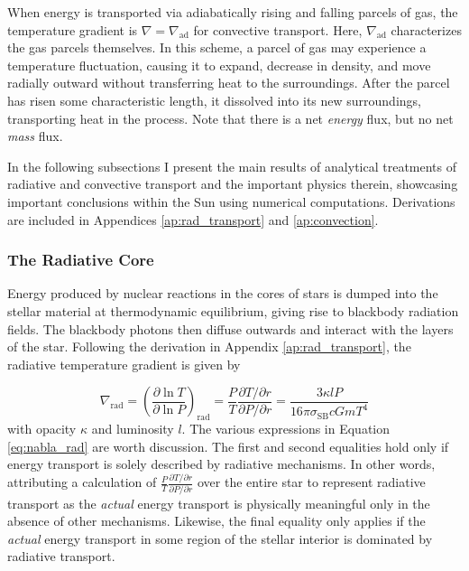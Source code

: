 \documentclass[12pt]{article}
\newcommand{\pderiv}[2]{\frac{\partial #1}{\partial #2}}
\newcommand{\bigparenthesis}[1]{\left(#1\right)}
\begin{document}
When energy is transported via adiabatically rising and falling parcels of gas, the temperature gradient is $\nabla = \nabla_\mathrm{ad}$ for convective transport. Here, $\nabla_\mathrm{ad}$ characterizes the gas parcels themselves. In this scheme, a parcel of gas may experience a temperature fluctuation, causing it to expand, decrease in density, and move radially outward without transferring heat to the surroundings. After the parcel has risen some characteristic length, it dissolved into its new surroundings, transporting heat in the process. Note that there is a net \textit{energy} flux, but no net \textit{mass} flux.

In the following subsections I present the main results of analytical treatments of radiative and convective transport and the important physics therein, showcasing important conclusions within the Sun using numerical computations. Derivations are included in Appendices \ref{ap:rad_transport} and \ref{ap:convection}.

\subsubsection{The Radiative Core}
Energy produced by nuclear reactions in the cores of stars is dumped into the stellar material at thermodynamic equilibrium, giving rise to blackbody radiation fields. The blackbody photons then diffuse outwards and interact with the layers of the star. Following the derivation in Appendix \ref{ap:rad_transport}, the radiative temperature gradient is given by

\begin{equation}
    \nabla_\mathrm{rad} = \bigparenthesis{\pderiv{\ln T}{\ln P}}_\mathrm{rad} = \frac{P}{T} \frac{\partial T/ \partial r}{\partial P/\partial r} = \frac{3\kappa l P}{16\pi \sigma_\mathrm{SB} c G m T^4} \label{eq:nabla_rad}
\end{equation}
%
with opacity $\kappa$ and luminosity $l$. The various expressions in Equation \ref{eq:nabla_rad} are worth discussion. The first and second equalities hold only if energy transport is solely described by radiative mechanisms. In other words, attributing a calculation of $\frac{P}{T} \frac{\partial T/ \partial r}{\partial P/\partial r}$ over the entire star to represent radiative transport as the \textit{actual} energy transport is physically meaningful only in the absence of other mechanisms. Likewise, the final equality only applies if the \textit{actual} energy transport in some region of the stellar interior is dominated by radiative transport.
\end{document}
